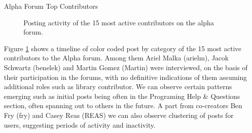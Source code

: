 \changepapersize{305.3mm:210mm}

{
	\LARGE
	\noindent Alpha Forum Top Contributors\par
	\vspace{0.2cm} 
}
\vfill

\begin{figure}[h!]
	\centering
	\caption{Posting activity of the 15 most active contributors on the alpha forum.}
	\label{fig:processing-alpha-dot}
\end{figure}

\begin{multicols}{3}
	\noindent
  Figure \ref*{fig:processing-alpha-dot} shows a timeline of color coded post by category of the 15 most active contributors to the Alpha forum. Among them Ariel Malka (arielm), Jacok Schwartz (benelek) and Martin Gomez (Martin) were interviewed, on the basis of their participation in the forums, with no definitive indications of them assuming additional roles such as library contributor. We can observe certain patterns emerging such as initial posts being often in the Programing Help \& Questions section, often spanning out to others in the future. A part from co-creators Ben Fry (fry) and Casey Reas (REAS) we can also observe clustering of posts for users, suggesting periods of activity and inactivity. 
  \columnbreak

  \vfill\null
\end{multicols}

